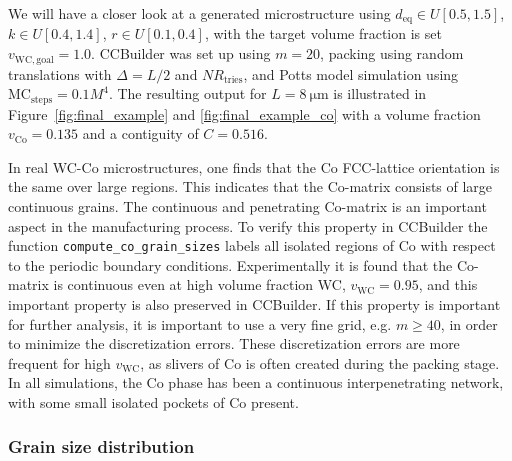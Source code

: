 \documentclass[3p,12pt]{elsarticle}
\newcommand{\Co}{\mathrm{Co}}
\newcommand{\WC}{\mathrm{WC}}
\begin{document}
% 

We will have a closer look at a generated microstructure using $d_\text{eq} \in U[0.5, 1.5]$, $k \in U[0.4, 1.4]$, $r \in U[0.1, 0.4]$, with the target volume fraction is set $v_{\WC,\text{goal}} = 1.0$. CCBuilder was set up using $m = 20$, packing using random translations with $\Delta = L/2$ and $NR_\text{tries}$, and Potts model simulation using $\text{MC}_\text{steps} = 0.1 M^4$.
The resulting output for $L = \SI{8}{\micro\meter}$ is illustrated in Figure~\ref{fig:final_example} and \ref{fig:final_example_co} with a volume fraction $v_\Co = 0.135$ and a contiguity of $C = 0.516$.

In real WC-Co microstructures, one finds that the Co FCC-lattice orientation is the same over large regions.
This indicates that the Co-matrix consists of large continuous grains.
The continuous and penetrating Co-matrix is an important aspect in the manufacturing process.
To verify this property in CCBuilder the function \verb+compute_co_grain_sizes+ labels all isolated regions of Co with respect to the periodic boundary conditions.
Experimentally it is found that the Co-matrix is continuous even at high volume fraction WC, $v_\WC = 0.95$, and this important property is also preserved in CCBuilder.
If this property is important for further analysis, it is important to use a very fine grid, e.g. $m \geq 40$, in order to minimize the discretization errors.
These discretization errors are more frequent for high $v_\WC$, as slivers of Co is often created during the packing stage.
In all simulations, the Co phase has been a continuous interpenetrating network, with some small isolated pockets of Co present.


\subsubsection{Grain size distribution}
\label{sec:grain_size_dist}
\end{document}
